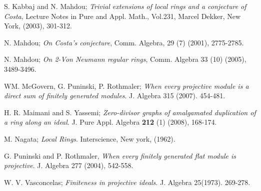 \documentclass{amsart}
\theoremstyle{definition}
\theoremstyle{remark}
\theoremstyle{Definition and Notation}
\begin{document}
\begin{thebibliography}{10}
       S. Kabbaj and N. Mahdou; \textit{Trivial extensions of local rings and a conjecture of Costa},
         Lecture  Notes in Pure and Appl. Math., Vol.231, Marcel Dekker, New York, (2003), 301-312.

      N. Mahdou; \textit{On Costa's conjecture}, Comm.
     Algebra, 29 (7) (2001), 2775-2785.

      N. Mahdou; \textit{On 2-Von Neumann regular rings}, Comm. Algebra 33 (10) (2005), 3489-3496.

      WM. McGovern, G. Puninski, P.
     Rothmaler; \textit{When every projective module is a direct sum of
     finitely generated modules}. J. Algebra 315 (2007). 454-481.

      H. R. Maimani and S. Yassemi; \textit{Zero-divisor graphs of amalgamated duplication
      of a ring along an ideal}. J. Pure Appl. Algebra {\bf 212} (1) (2008), 168-174.

       M. Nagata; \textit{Local Rings}. Interscience, New york, (1962).

      G. Puninski and P. Rothmaler, \textit{When every
     finitely generated flat module is projective}. J. Algebra 277 (2004), 542-558.

     W. V. Vasconcelas; \textit{Finiteness in projective ideals}.
     J. Algebra 25(1973). 269-278.
\end{thebibliography}
\end{document}
